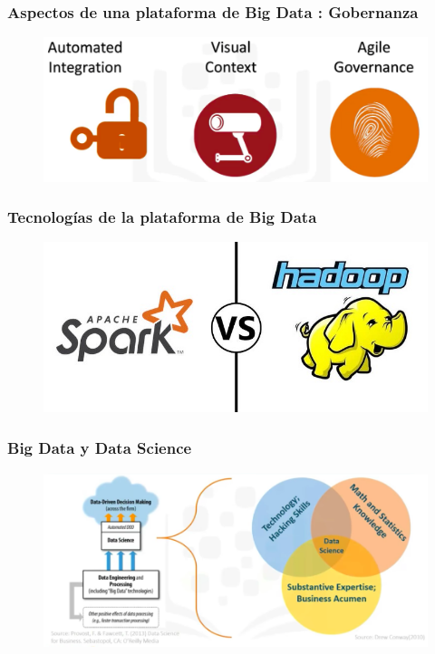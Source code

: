\documentclass{beamer}
\begin{document}
\begin{frame}
\frametitle{Aspectos de una plataforma de Big Data : Gobernanza}
\begin{figure}
\includegraphics[scale=0.3]{img/3_Governance}
\end{figure}
\end{frame}

\begin{frame}
\frametitle{Tecnolog\'ias de la plataforma de Big Data}
\begin{figure}
\includegraphics[scale=0.3]{img/3_hadoop_vs_spark}
\end{figure}
\end{frame}

\begin{frame}
\frametitle{Big Data y Data Science}
\begin{figure}
\includegraphics[scale=0.325]{img/3_BigData_DataScience}
\end{figure}
\end{frame}
\end{document}
